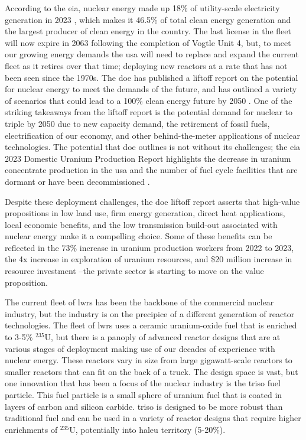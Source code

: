 According to the \gls{eia}, nuclear energy made up 18\% of utility-scale
electricity generation in 2023 \cite{eia_elec_gen_2024}, which makes it 46.5\%
of total clean energy generation and the largest producer of clean energy in
the country. The last license in the fleet will now expire in 2063 following
the completion of Vogtle Unit 4, but, to meet our growing energy demands the
\gls{usa} will need to replace and expand the current fleet as it retires over
that time; deploying new reactors at a rate that has not been seen since the
1970s. The \gls{doe} has published a liftoff report on the potential for
nuclear energy to meet the demands of the future, and has outlined a variety of
scenarios that could lead to a 100\% clean energy future by 2050
\cite{julie_liftoff_pathways_2024}. One of the striking takeaways from the
liftoff report is the potential demand for nuclear to triple by 2050 due to new
capacity demand, the retirement of fossil fuels, electrification of our
economy, and other behind-the-meter applications of nuclear technologies. The
potential that \gls{doe} outlines is not without its challenges; the \gls{eia}
2023 Domestic Uranium Production Report highlights the decrease in uranium
concentrate production in the \gls{usa} and the number of fuel cycle facilities
that are dormant or have been decommissioned \cite{eia_uranium_statistics_2023}.

Despite these deployment challenges, the \gls{doe} liftoff report asserts that
high-value propositions in low land use, firm energy generation, direct heat
applications, local economic benefits, and the low transmission build-out
associated with nuclear energy make it a compelling choice. Some of these
benefits can be reflected in the 73\% increase in uranium production workers
from 2022 to 2023, the 4x increase in exploration of uranium resources, and
\$20 million increase in resource investment \cite{eia_uranium_statistics_2023}
--the private sector is starting to move on the value proposition.

The current fleet of \gls{lwr}s has been the backbone of the commercial nuclear
industry, but the industry is on the precipice of a different generation of
reactor technologies. The fleet of \gls{lwr}s uses a ceramic uranium-oxide fuel
that is enriched to 3-5\% $^{235}$U, but there is a panoply of advanced reactor
designs that are at various stages of deployment making use of our decades of
experience with nuclear energy. These reactors vary in size from large
gigawatt-scale reactors to smaller reactors that can fit on the back of a
truck. The design space is vast, but one innovation that has been a focus of
the nuclear industry is the \gls{triso} fuel particle. This fuel particle is a
small sphere of uranium fuel that is coated in layers of carbon and silicon
carbide. \gls{triso} is designed to be more robust than traditional fuel and
can be used in a variety of reactor designs that require higher enrichments of
$^{235}$U, potentially into \gls{haleu} territory (5-20\%).

